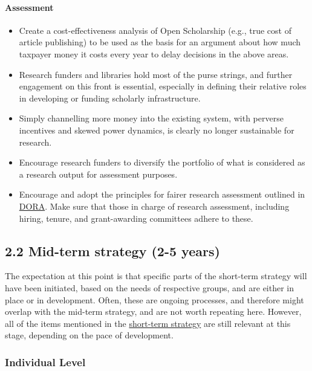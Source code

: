 \paragraph{Assessment}\label{assessment-3}

\begin{itemize}
\item
  Create a cost-effectiveness analysis of Open Scholarship (e.g., true
  cost of article publishing) to be used as the basis for an argument
  about how much taxpayer money it costs every year to delay decisions
  in the above areas.
\item
  Research funders and libraries hold most of the purse strings, and
  further engagement on this front is essential, especially in defining
  their relative roles in developing or funding scholarly
  infrastructure.
\item
  Simply channelling more money into the existing system, with perverse
  incentives and skewed power dynamics, is clearly no longer sustainable
  for research.
\item
  Encourage research funders to diversify the portfolio of what is
  considered as a research output for assessment purposes.
\item
  Encourage and adopt the principles for fairer research assessment
  outlined in \href{https://sfdora.org/read/}{DORA}. Make sure that
  those in charge of research assessment, including hiring, tenure, and
  grant-awarding committees adhere to these.
\end{itemize}

\subsection{2.2 Mid-term strategy (2-5 years)
}\label{mid-term-strategy-2-5-years}

The expectation at this point is that specific parts of the short-term
strategy will have been initiated, based on the needs of respective
groups, and are either in place or in development. Often, these are
ongoing processes, and therefore might overlap with the mid-term
strategy, and are not worth repeating here. However, all of the items
mentioned in the \protect\hyperlink{Short}{short-term strategy} are
still relevant at this stage, depending on the pace of development.

\subsubsection{Individual Level}\label{individual-level-1}


